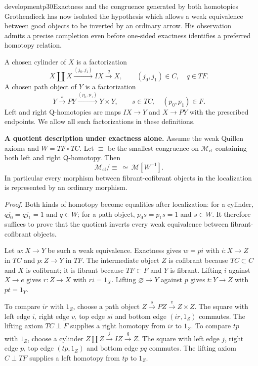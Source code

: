 \begin{dcomment}{development}{p30}{Exactness and the congruence generated by both homotopies}
Grothendieck has now isolated the hypothesis which allows a weak equivalence between good objects to be inverted by an ordinary arrow. His observation admits a precise completion even before one-sided exactness identifies a preferred homotopy relation.

A chosen cylinder of $X$ is a factorization
\[
 X\amalg X\xrightarrow{(j_0,j_1)}IX\xrightarrow{q}X,
 \qquad (j_0,j_1)\in C,\quad q\in TF.
\]
A chosen path object of $Y$ is a factorization
\[
 Y\xrightarrow{s}PY\xrightarrow{(p_0,p_1)}Y\times Y,
 \qquad s\in TC,\quad(p_0,p_1)\in F.
\]
Left and right Q-homotopies are maps $IX\to Y$ and $X\to PY$ with the prescribed endpoints. We allow all such factorizations in these definitions.

\noindent\textbf{A quotient description under exactness alone.}\ours\quad
Assume the weak Quillen axioms and $W=TF\circ TC$. Let $\equiv$ be the smallest congruence on $\mathcal M_{\mathrm{cf}}$ containing both left and right Q-homotopy. Then
\[
 \mathcal M_{\mathrm{cf}}/{\equiv}\ \simeq\ \mathcal M[W^{-1}].
\]
In particular every morphism between fibrant-cofibrant objects in the localization is represented by an ordinary morphism.

\emph{Proof.} Both kinds of homotopy become equalities after localization: for a cylinder, $qj_0=qj_1=1$ and $q\in W$; for a path object, $p_0s=p_1s=1$ and $s\in W$. It therefore suffices to prove that the quotient inverts every weak equivalence between fibrant-cofibrant objects.

Let $w:X\to Y$ be such a weak equivalence. Exactness gives $w=pi$ with $i:X\to Z$ in $TC$ and $p:Z\to Y$ in $TF$. The intermediate object $Z$ is cofibrant because $TC\subset C$ and $X$ is cofibrant; it is fibrant because $TF\subset F$ and $Y$ is fibrant. Lifting $i$ against $X\to e$ gives $r:Z\to X$ with $ri=1_X$. Lifting $\varnothing\to Y$ against $p$ gives $t:Y\to Z$ with $pt=1_Y$.

To compare $ir$ with $1_Z$, choose a path object $Z\xrightarrow{s}PZ\xrightarrow{v}Z\times Z$. The square with left edge $i$, right edge $v$, top edge $si$ and bottom edge $(ir,1_Z)$ commutes. The lifting axiom $TC\perp F$ supplies a right homotopy from $ir$ to $1_Z$. To compare $tp$ with $1_Z$, choose a cylinder $Z\amalg Z\xrightarrow{j}IZ\xrightarrow{q}Z$. The square with left edge $j$, right edge $p$, top edge $(tp,1_Z)$ and bottom edge $pq$ commutes. The lifting axiom $C\perp TF$ supplies a left homotopy from $tp$ to $1_Z$.


\end{dcomment}
